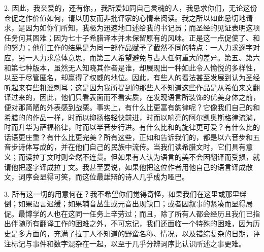 2. 因此，我亲爱的，还有你，，我所爱如同自己灵魂的人，我恳求你们，无论这份仓促之作价值如何，请以朋友而非批评家的心情来阅读。我之所以如此恳切地请求，是因为如你们所知，我极为迅速地口述给我的书记员；而圣经的见证表明这项任务何其困难；因为七十子希腊译本并未保留原有的风味。正是这一点促使了、和的努力；他们工作的结果是为同一部作品赋予了截然不同的特点：一人力求逐字对应，另一人力求总体意思，而第三人希望避免与古人任何重大的差异。第五、第六和第七种版本，虽然无人知晓其作者是谁，却展现出一种如此令人愉悦的多样性，以至于尽管匿名，却赢得了权威的地位。因此，有些人的看法甚至发展到认为圣经听起来有些粗涩刺耳；这是因为我所提到的那些人不知道这些作品是从希伯来文翻译过来的，因此，他们只看表面而不看实质，在发现语言所装饰的优美身体之前，便对那简陋的外表感到战栗。事实上，有什么比更富有韵律呢？它像我们自己的和希腊的的作品一样，时而以抑扬格轻快前进，时而以响亮的阿尔凯奥斯格律流淌，时而升华为萨福格律，时而以半音步行进。有什么比和的旋律更可爱？有什么比的话语更庄重？有什么比更完美？所有这些，正如和告诉我们的，都是以六音步和五音步诗体写成的，并在他们自己的民族中流传。当我们读希腊文时，它们具有意义；而读拉丁文时则全然不连贯。但如果有人认为语言的美不会因翻译而受损，就请他把逐字译成拉丁文。我甚至要说，如果他把这位作者用他自己的语言译成散文，词序会显得可笑，而这位最雄辩的诗人几乎成为哑巴。\par

3. 所有这一切的用意何在？我不希望你们觉得奇怪，如果我们在这里或那里绊倒；如果语言迟缓；如果辅音丛生或元音出现缺口；或者因叙事的紧凑而显得局促。最博学的人也在这同一任务上辛劳过；而且，除了所有人都会经历且我们已指出伴随所有翻译工作的困难之外，不可忘记，我们还面临一个特殊的困难，因为历史是多方面的，充满了拉丁人不知道的野蛮名称、情况，以及错综复杂的日期，评注标记与事件和数字混杂在一起，以至于几乎分辨词序比认识所述之事更难。\par

\par


